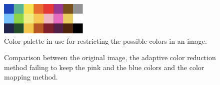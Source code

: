 \begin{figure}[!ht]
	\centering
		\includegraphics[width=\columnwidth, height=45pt]{Figures/colours.pdf}
	\caption{Color palette in use for restricting the possible colors in an image.}
	\label{fig:colors}
\end{figure}


\begin{figure}[!htb]
  \begin{subfigmatrix}{3}
  \end{subfigmatrix}
  \caption{Comparison between the original image, the adaptive color reduction method failing to keep the pink and the blue colors and the color mapping method.}
  \label{fig:pink}
\end{figure}


